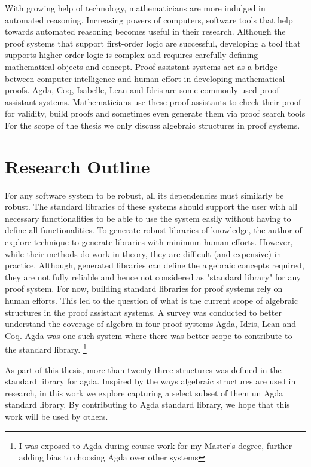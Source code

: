 With growing help of technology, mathematicians are more indulged in automated
reasoning. Increasing powers of computers, software tools that help towards
automated reasoning becomes useful in their research. Although the proof systems
that support first-order logic are successful, developing a tool that supports
higher order logic is complex \cite{phillips2010automated} and requires
carefully defining mathematical objects and concept. Proof assistant systems act
as a bridge between computer intelligence and human effort in developing
mathematical proofs. Agda, Coq, Isabelle, Lean and Idris are some commonly used
proof assistant systems. Mathematicians use these proof assistants to check their
proof for validity, build proofs and sometimes even generate them via proof
search tools  For the scope of the thesis we only discuss algebraic
structures in proof systems.\\


\section{Research Outline}
For any software system to be robust, all its dependencies must similarly be
robust. The standard libraries of these systems should support the user with all
necessary functionalities to be able to use the system easily without having to
define all functionalities. To generate robust libraries of knowledge, the
author of \cite{BuildingDiamond} explore technique to generate libraries with
minimum human efforts. However, while their methods do work in theory, they are
difficult (and expensive) in practice. Although, generated libraries can define
the algebraic concepts required, they are not fully reliable and hence not
considered as "standard library" for any proof system. For now, building
standard libraries for proof systems rely on human efforts. This led to the
question of what is the current scope of algebraic structures in the proof
assistant systems. A survey was conducted to better understand the coverage of
algebra in four proof systems Agda, Idris, Lean and Coq. Agda was one such
system where there was better scope to contribute to the standard library.
\footnote{I was exposed to Agda during course work for my Master's degree,
further adding bias to choosing Agda over other systems} 

As part of this thesis, more than twenty-three structures was defined in the
standard library for agda. Inspired by the ways algebraic structures are used in
research, in this work we explore capturing a select subset of them un Agda
standard library. By contributing to Agda standard library, we hope that this
work will be used by others.

